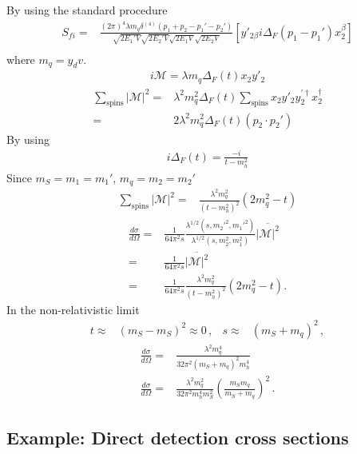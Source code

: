 By using the standard procedure
\begin{align}
      S_{fi}
    =&\frac{(2\pi)^4 \lambda m_q \delta^{(4)}\left(p_1+p_2-p_1'-p_2'\right) }{\sqrt{2 E_1'V}\sqrt{2 E_2'V}\sqrt{2 E_1V}\sqrt{2 E_2V}}
 \left[y'_{2\beta}i\Delta_F(p_1-p_1')x_2^{\beta}\right] \nonumber\\
\end{align}
where $m_q=y_d v$.
\begin{align}
 i\mathcal{M}=\lambda  m_q\Delta_F(t) x_2y'_2 
\end{align}
\begin{align}
\sum_{\text{spins}} |\mathcal{M}|^2=&\lambda^2   m_q^2\Delta_F(t) \sum_{\text{spins}}  x_2y'_2  y^{\prime\dagger}_2x_2^{\dagger} \nonumber\\
=& 2 \lambda^2 m_q^2\Delta_F(t) \left( p_2\cdot p_2' \right) 
\end{align}
By using
\begin{align}
  i\Delta_F(t)=\frac{-i}{t-m_h^2}
\end{align}
Since $m_S=m_1=m_1'$, $m_q=m_2=m_2'$
\begin{align}
   \sum_{\text{spins}} |\mathcal{M}|^2=&\frac{\lambda^2 m_q^2}{\left( t-m_h^2 \right)^2} \left(2m_q^2-t\right)
\end{align}
\begin{align}
     \frac{d\sigma}{d\Omega}=&\frac{1}{64\pi^2s}
\frac{\lambda^{1/2}(s,{m_2'}^2,{m_1'}^2)}{\lambda^{1/2}(s,m_2^2,m_1^2)}
\overline{|\mathcal{M}|^2} \nonumber\\
=&\frac{1}{64\pi^2s}\overline{|\mathcal{M}|^2} \nonumber\\
=&\frac{1}{64\pi^2s}\frac{\lambda^2 m_q^2}{\left( t-m_h^2 \right)^2}\left(2m_q^2-t\right) .
\end{align}
In the non-relativistic limit
\begin{align}
  t\approx& (m_S-m_S)^2\approx 0\,,& 
  s\approx& (m_S+m_q)^2\,,
\end{align}
\begin{align}
   \frac{d\sigma}{d\Omega}=&
\frac{\lambda^2 m_q^4}{32\pi^2 \left(m_S+m_q\right)^2m_h^4}\nonumber\\
       \frac{d\sigma}{d\Omega}
                    =&\frac{\lambda^2m_q^2}{32\pi^2m_h^4m_S^2}\left( \frac{m_Sm_q}{m_S+m_q} \right)^2\,.
\end{align}

\subsection{Example: Direct detection cross sections}

